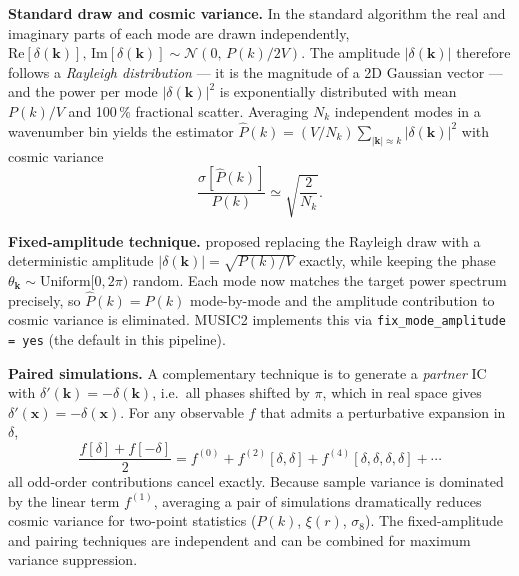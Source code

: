 \documentclass[12pt]{article}
\newcommand{\bx}{\mathbf{x}}
\newcommand{\bk}{\mathbf{k}}
\begin{document}
\begin{tcolorbox}[
  title={Fixed-amplitude (``paired-and-fixed'') ICs \citep{Angulo2016}},
  colback=gray!5,
  colframe=gray!55!black,
  coltitle=white,
  fonttitle=\bfseries,
  breakable,
  before skip=1.2em,
  after skip=1.2em
]

\textbf{Standard draw and cosmic variance.}
In the standard algorithm the real and imaginary parts of each mode are drawn
independently,
$\mathrm{Re}[\delta(\bk)],\,\mathrm{Im}[\delta(\bk)]
 \sim \mathcal{N}(0,\,P(k)/2V)$.
The amplitude $|\delta(\bk)|$ therefore follows a \emph{Rayleigh
distribution} — it is the magnitude of a 2D Gaussian vector — and the
power per mode $|\delta(\bk)|^2$ is exponentially distributed with mean
$P(k)/V$ and 100\,\% fractional scatter.
Averaging $N_k$ independent modes in a wavenumber bin yields the estimator
$\hat{P}(k) = (V/N_k)\sum_{|\bk|\approx k}|\delta(\bk)|^2$ with cosmic
variance
%
\begin{equation*}
  \frac{\sigma[\hat{P}(k)]}{P(k)} \simeq \sqrt{\frac{2}{N_k}}.
\end{equation*}

\textbf{Fixed-amplitude technique.}
\citet{Angulo2016} proposed replacing the Rayleigh draw with a deterministic
amplitude $|\delta(\bk)| = \sqrt{P(k)/V}$ exactly, while keeping the
phase $\theta_\bk \sim \mathrm{Uniform}[0,2\pi)$ random.
Each mode now matches the target power spectrum precisely, so
$\hat{P}(k) = P(k)$ mode-by-mode and the amplitude contribution to
cosmic variance is eliminated.
MUSIC2 implements this via \texttt{fix\_mode\_amplitude = yes}
(the default in this pipeline).

\textbf{Paired simulations.}
A complementary technique is to generate a \emph{partner} IC with
$\delta'(\bk) = -\delta(\bk)$, i.e.\ all phases shifted by $\pi$, which
in real space gives $\delta'(\bx) = -\delta(\bx)$.
For any observable $f$ that admits a perturbative expansion in $\delta$,
%
\begin{equation*}
  \frac{f[\delta]+f[-\delta]}{2}
  = f^{(0)} + f^{(2)}[\delta,\delta] + f^{(4)}[\delta,\delta,\delta,\delta]
  + \cdots
\end{equation*}
%
all odd-order contributions cancel exactly.
Because sample variance is dominated by the linear term $f^{(1)}$,
averaging a pair of simulations dramatically reduces cosmic variance
for two-point statistics ($P(k)$, $\xi(r)$, $\sigma_8$).
The fixed-amplitude and pairing techniques are independent and can be
combined for maximum variance suppression.


\end{tcolorbox}
\end{document}

